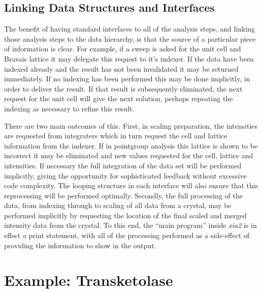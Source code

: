 \documentclass[preprint,pdf]{iucr}
\begin{document}
\subsection{Linking Data Structures and Interfaces}

The benefit of having standard interfaces to all of the analysis
steps, and linking those analysis steps to the data hierarchy, is that
the source of a particular piece of information
is clear. For example, if a sweep is asked for the unit cell and Bravais
lattice it may delegate this request to it's indexer. If the data have
been indexed already and the result has not been invalidated it may be returned
immediately. If no indexing has been performed this may be done
implicitly, in order to deliver the result. If that result is
subsequently eliminated, the next request for the unit cell will give
the next solution, perhaps repeating the indexing as necessary to
refine this result. 

There are two main outcomes of this. First, in scaling preparation, 
the intensities are requested from integraters which in turn request
the cell and lattice
information from the indexer. If in pointgroup analysis this
lattice is shown to be incorrect it may be eliminated and new
values requested for the cell, lattice and intensities. If necessary
the full integration of the data set will be performed implicitly,
giving the opportunity for sophisticated feedback without excessive
code complexity. The looping structure in each interface will also
ensure that this reprocessing will be performed optimally.
Secondly, the full processing
of the data, from indexing through to scaling of all data from a
crystal, may be performed implicitly by requesting the location of the
final scaled and merged intensity data from the crystal. To this end,
the ``main program'' inside \emph{xia2} is in effect a print statement,
with all of the processing performed as a side-effect of providing the
information to show in the output.

\section{Example: Transketolase}
\end{document}
